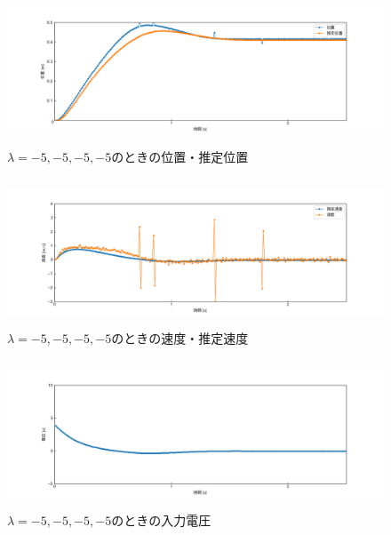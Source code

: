 \documentclass[12pt]{jsarticle}
\begin{document}
\begin{figure}[H]
  \begin{center}
    \includegraphics[clip,width=13.0cm, height=4.4cm]{../img/Exp10-1.png}
    \caption{$\lambda=-5, -5, -5, -5$のときの位置・推定位置}
    \label{Exp10-1}
  \end{center}
\end{figure}
\begin{figure}[H]
  \begin{center}
    \includegraphics[clip,width=13.0cm, height=4.4cm]{../img/Exp10-2.png}
    \caption{$\lambda=-5, -5, -5, -5$のときの速度・推定速度}
    \label{Exp10-2}
  \end{center}
\end{figure}
\begin{figure}[H]
  \begin{center}
    \includegraphics[clip,width=13.0cm, height=4.4cm]{../img/Exp10-3.png}
    \caption{$\lambda=-5, -5, -5, -5$のときの入力電圧}
    \label{Exp10-3}
  \end{center}
\end{figure}
\end{document}
